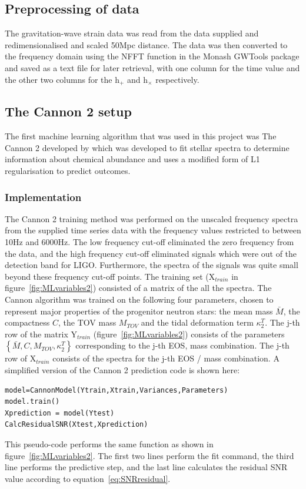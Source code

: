 \subsection{Preprocessing of data}
The gravitation-wave strain data was read from the data supplied and redimensionalised and scaled 50Mpc distance. The data was then converted to the frequency domain using the NFFT function in the Monash GWTools package and saved as a text file for later retrieval, with one column for the time value and the other two columns for the h$_+$ and h$_\times$ respectively. 
\subsection{The Cannon 2 setup}
\label{sec:TheCannonSetup}
The first machine learning algorithm that was used in this project was The Cannon 2 developed by \cite{Casey2016} which was developed to fit stellar spectra to determine information about chemical abundance and uses a modified form of L1 regularisation to predict outcomes. 
\subsubsection{Implementation}
The Cannon 2 training method was performed on the unscaled frequency spectra from the supplied time series data with the frequency values restricted to between 10Hz and 6000Hz.  The low frequency cut-off eliminated the zero frequency from the data, and the high frequency cut-off eliminated signals which were out of the detection band for LIGO.  Furthermore, the spectra of the signals was quite small beyond these frequency cut-off points.  The training set  (X$_{train}$ in figure~\ref{fig:MLvariables2}) consisted of a matrix of the all the spectra. The Cannon algorithm was trained on the following four parameters, chosen to represent major properties of the progenitor neutron stars: the mean mass $\bar{M}$, the compactness $C$, the TOV mass $M_{TOV}$ and the tidal deformation term $\kappa^T_2$. The j-th row of the matrix Y$_{train}$ (figure~\ref{fig:MLvariables2}) consists of the parameters $\left\lbrace \bar{M}, C, M_{TOV}, \kappa^T_2 \right\rbrace$ corresponding to the j-th EOS, mass combination. The j-th row of X$_{train}$ consists of the spectra for the j-th EOS / mass combination.  A simplified version of the Cannon 2 prediction code is shown here:
\begin{lstlisting}[basicstyle=\small]
model=CannonModel(Ytrain,Xtrain,Variances,Parameters) 
model.train()
Xprediction = model(Ytest)
CalcResidualSNR(Xtest,Xprediction)
\end{lstlisting}
This pseudo-code performs the same function as shown in figure~\ref{fig:MLvariables2}. The first two lines perform the fit command, the third line performs the predictive step, and the last line calculates the residual SNR value according to equation~\ref{eq:SNRresidual}. 
 
